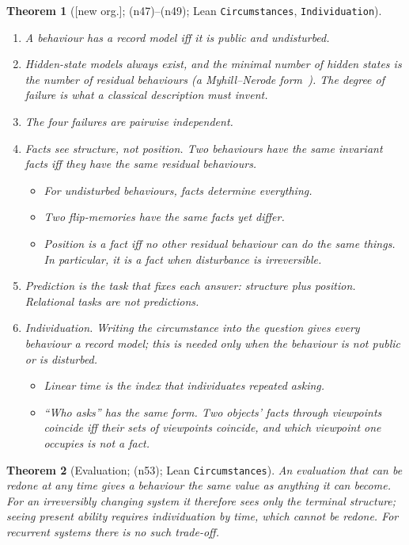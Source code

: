 \documentclass[11pt]{article}
\newtheorem{theorem}{Theorem}[section]
\theoremstyle{definition}
\theoremstyle{remark}
\newcommand{\lean}[1]{\texttt{#1}}
\newcommand{\status}[1]{\textsf{[#1]}}
\newcommand{\note}[1]{\textsf{(n#1)}}
\begin{document}
\begin{theorem}[\status{new org.}; \note{47}--\note{49}; Lean \lean{Circumstances}, \lean{Individuation}]\label{thm:circ}
\leavevmode
\begin{enumerate}
\item A behaviour has a record model iff it is public and undisturbed.
\item Hidden-state models always exist, and the minimal number of hidden states is the number of residual behaviours (a Myhill--Nerode form~\cite{Myhill57,Nerode58}). The \emph{degree of failure} is what a classical description must invent.
\item The four failures are pairwise independent.
\item \emph{Facts see structure, not position.} Two behaviours have the same invariant facts iff they have the same residual behaviours.
  \begin{itemize}
  \item For undisturbed behaviours, facts determine everything.
  \item Two flip-memories have the same facts yet differ.
  \item Position is a fact iff no other residual behaviour can do the same things. In particular, it is a fact when disturbance is irreversible.
  \end{itemize}
\item \emph{Prediction} is the task that fixes each answer: structure plus position. Relational tasks are not predictions.
\item \emph{Individuation.} Writing the circumstance into the question gives every behaviour a record model; this is needed only when the behaviour is not public or is disturbed.
  \begin{itemize}
  \item Linear time is the index that individuates repeated asking.
  \item ``Who asks'' has the same form. Two objects' facts through viewpoints coincide iff their sets of viewpoints coincide, and which viewpoint one occupies is not a fact.
  \end{itemize}
\end{enumerate}
\end{theorem}

\begin{theorem}[Evaluation; \note{53}; Lean \lean{Circumstances}]
An evaluation that can be redone at any time gives a behaviour the same value as anything it can become. For an irreversibly changing system it therefore sees only the terminal structure; seeing present ability requires individuation by time, which cannot be redone. For recurrent systems there is no such trade-off.
\end{theorem}
\end{document}
